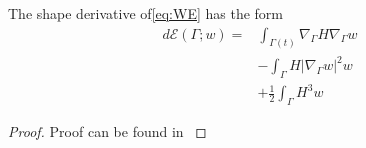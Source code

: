 \begin{lemma}
The shape derivative of\eqref{eq:WE} has the form
\[
    \begin{split}
        d\mathcal{E} \left( \Gamma; w  \right)  =& \int_{\Gamma \left( t \right) }^{}  \nabla_{\Gamma } H  \nabla _{\Gamma } w    \\
    & - \int_{\Gamma }^{} H  |\nabla _{\Gamma }  w |^{2} w   \\
    &  + \frac{1}{2} \int_{\Gamma }^{} H^{3} w
    \end{split}
\]

\end{lemma}

\begin{proof}
    Proof can be found in \cite{willmore1996riemannian}
\end{proof}









